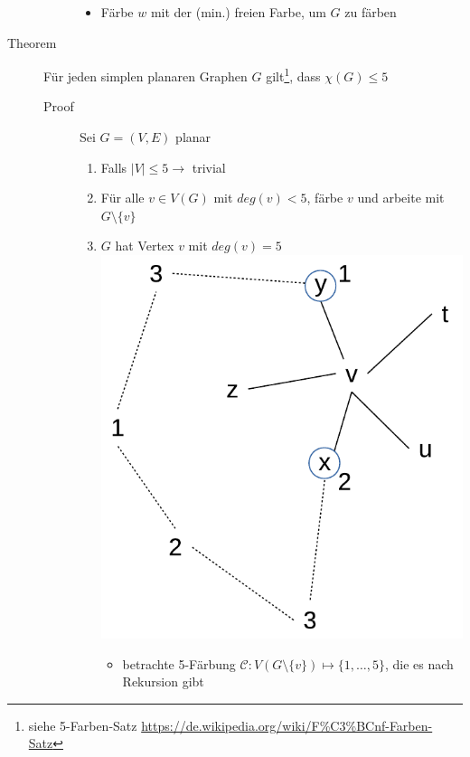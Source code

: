 \begin{description}
\begin{description}
\begin{itemize}
                \item Färbe $w$ mit der (min.) freien Farbe, um $G$ zu färben
            \end{itemize}
        \end{description}
    \item[Theorem] Für jeden simplen planaren Graphen $G$ gilt\footnote{siehe 5-Farben-Satz \url{https://de.wikipedia.org/wiki/F\%C3\%BCnf-Farben-Satz}}, dass $\chi(G) \leqslant 5$
        \begin{description}
            \item[Proof] Sei $G=(V,E)$ planar
                \begin{enumerate}
                    \item Falls $|V| \leqslant 5 \rightarrow$ trivial
                    \item Für alle $v \in V(G)$ mit $deg(v) < 5$, färbe $v$ und arbeite mit $G \setminus \{v\}$
                    \item $G$ hat Vertex $v$ mit $deg(v) = 5$
                        \includegraphics[scale=0.5]{lectures/161125/pix/2.pdf}
                        \begin{itemize}
                            \item betrachte 5-Färbung $\mathcal{C} \colon V(G \setminus \{v\}) \mapsto \{1, \dots, 5\}$, die es nach Rekursion gibt

\end{itemize}
\end{enumerate}
\end{description}
\end{description}
